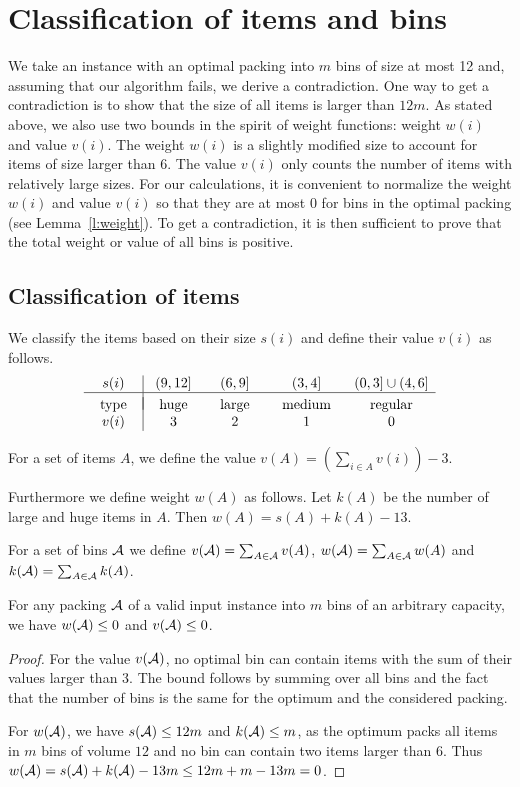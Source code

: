 \section{Classification of items and bins}

We take an instance with an optimal packing into $m$ bins of size at
most 12 and, assuming that our algorithm fails, we derive a
contradiction. One way to get a contradiction is to show that the size
of all items is larger than $12m$. As stated above, 
we also use two bounds in the
spirit of weight functions: weight $w(i)$ and value $v(i)$. The weight
$w(i)$ is a slightly modified size to account for items of size larger
than 6. The value $v(i)$ only counts the number of items with
relatively large sizes. For our calculations, it is convenient to
normalize the weight $w(i)$ and value $v(i)$ so that they are at most
0 for bins in the optimal packing (see Lemma~\ref{l:weight}). To get a contradiction, it is then sufficient to prove that
the total weight or value of all bins is positive.

\subsection{Classification of items}

We classify the items based on their size $s(i)$ and define their
value $v(i)$ as follows.  
$$
\begin{array}{c|cccc}
s(i) & (9,12] &(6,9] &(3,4] &(0,3]\cup(4,6]\\
\hline\\[-0.9em]
\mbox{~~type~~} & \mbox{~~huge~~} &\mbox{~~large~~} &\mbox{~~medium~~} &\mbox{~~regular~~}\\
v(i) & 3 & 2 & 1 & 0
\end{array}
$$

\begin{dfn}
For a set of items $A$, we define the value $v(A)=(\sum_{i\in
  A}v(i))-3$.

Furthermore we define weight $w(A)$ as follows. Let $k(A)$ be the
number of large and huge items in $A$. Then $w(A)=s(A)+k(A)-13$.

For a set of bins ${\mathcal A}$ we define $v({\mathcal A})=\sum_{A\in{\mathcal A}}v(A)$,
$w({\mathcal A})=\sum_{A\in{\mathcal A}}w(A)$ and $k({\mathcal A})=\sum_{A\in{\mathcal A}}k(A)$.
\end{dfn}

\begin{lem}
\label{l:weight}
For any packing ${\mathcal A}$ of a valid input instance into $m$ bins of an
arbitrary capacity,
we have $w({\mathcal A})\leq 0$ and $v({\mathcal A})\leq 0$.
\end{lem}
\begin{proof}
For the value $v({\mathcal A})$, no optimal bin can contain items
with the sum of their values larger than 3. The bound follows by
summing over all bins and the fact that the number of bins is the same
for the optimum and the considered packing. 

For $w({\mathcal A})$, we have $s({\mathcal A})\leq 12m$ and $k({\mathcal A})\leq m$, as the
optimum packs all items in $m$ bins of volume $12$ and no bin can
contain two items larger than $6$. Thus
$w({\mathcal A})=s({\mathcal A})+k({\mathcal A})-13m\leq 12m+m-13m=0$.
\end{proof}

